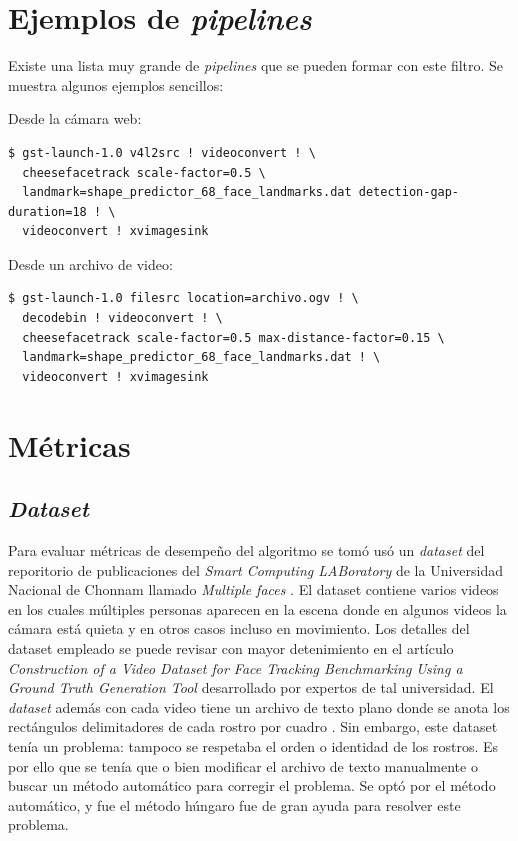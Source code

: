 \documentclass[a4paper,openright,12pt]{report}
\begin{document}
\section{Ejemplos de \textit{pipelines}}
Existe una lista muy grande de \textit{pipelines} que se pueden formar con este
filtro. Se muestra algunos ejemplos sencillos:

Desde la cámara web:
\begin{verbatim}
$ gst-launch-1.0 v4l2src ! videoconvert ! \
  cheesefacetrack scale-factor=0.5 \
  landmark=shape_predictor_68_face_landmarks.dat detection-gap-duration=18 ! \
  videoconvert ! xvimagesink
\end{verbatim}

Desde un archivo de video:
\begin{verbatim}
$ gst-launch-1.0 filesrc location=archivo.ogv ! \
  decodebin ! videoconvert ! \
  cheesefacetrack scale-factor=0.5 max-distance-factor=0.15 \
  landmark=shape_predictor_68_face_landmarks.dat ! \
  videoconvert ! xvimagesink
\end{verbatim}

\section{Métricas}
\subsection{\textit{Dataset}}
Para evaluar métricas de desempeño del algoritmo se tomó usó un \textit{dataset}
del reporitorio de publicaciones del \textit{Smart Computing LABoratory} de la
Universidad Nacional de Chonnam llamado \textit{Multiple faces}
\cite{chonnamDataset}. El dataset contiene varios
videos en los cuales múltiples personas aparecen en la escena donde en algunos
videos la cámara está quieta y en otros casos incluso en movimiento. Los
detalles del dataset empleado se puede revisar con mayor detenimiento en el
artículo \textit{Construction of a Video Dataset for Face Tracking Benchmarking
Using a Ground Truth Generation Tool} \cite{do2014construction} desarrollado por
expertos de tal universidad. El \textit{dataset} además con cada video tiene un
archivo de texto plano donde se anota los rectángulos delimitadores de cada
rostro por cuadro \cite{do2014construction}. Sin embargo, este dataset tenía un
problema: tampoco se respetaba el orden o identidad de los rostros. Es por
ello que se tenía que o bien modificar el archivo de texto manualmente o buscar
un método automático para corregir el problema. Se optó por el método
automático, y fue el método húngaro fue de gran ayuda para resolver este
problema.
\end{document}
